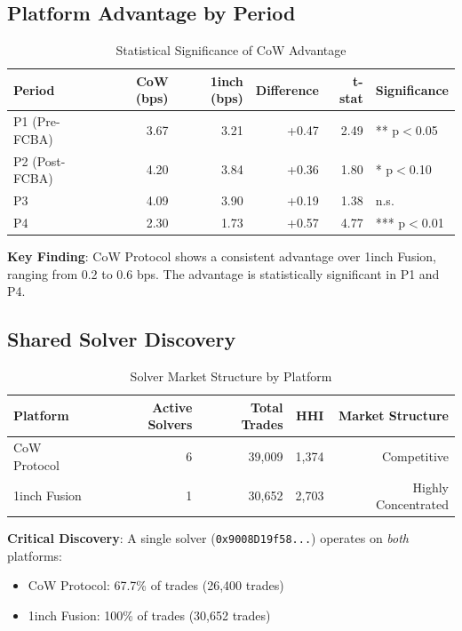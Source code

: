 \documentclass[11pt,a4paper]{article}
\begin{document}
\subsection{Platform Advantage by Period}

\begin{table}[H]
\centering
\caption{Statistical Significance of CoW Advantage}
\begin{tabular}{lrrrrl}
\toprule
\textbf{Period} & \textbf{CoW (bps)} & \textbf{1inch (bps)} & \textbf{Difference} & \textbf{t-stat} & \textbf{Significance} \\
\midrule
P1 (Pre-FCBA) & 3.67 & 3.21 & +0.47 & 2.49 & ** p$<$0.05 \\
P2 (Post-FCBA) & 4.20 & 3.84 & +0.36 & 1.80 & * p$<$0.10 \\
P3 & 4.09 & 3.90 & +0.19 & 1.38 & n.s. \\
P4 & 2.30 & 1.73 & +0.57 & 4.77 & *** p$<$0.01 \\
\bottomrule
\end{tabular}
\end{table}

\textbf{Key Finding}: CoW Protocol shows a consistent advantage over 1inch Fusion, ranging from 0.2 to 0.6 bps. The advantage is statistically significant in P1 and P4.

\subsection{Shared Solver Discovery}

\begin{table}[H]
\centering
\caption{Solver Market Structure by Platform}
\begin{tabular}{lrrrr}
\toprule
\textbf{Platform} & \textbf{Active Solvers} & \textbf{Total Trades} & \textbf{HHI} & \textbf{Market Structure} \\
\midrule
CoW Protocol & 6 & 39,009 & 1,374 & Competitive \\
1inch Fusion & 1 & 30,652 & 2,703 & Highly Concentrated \\
\bottomrule
\end{tabular}
\end{table}

\textbf{Critical Discovery}: A single solver (\texttt{0x9008D19f58...}) operates on \textit{both} platforms:
\begin{itemize}
    \item CoW Protocol: 67.7\% of trades (26,400 trades)
    \item 1inch Fusion: 100\% of trades (30,652 trades)
\end{itemize}
\end{document}
